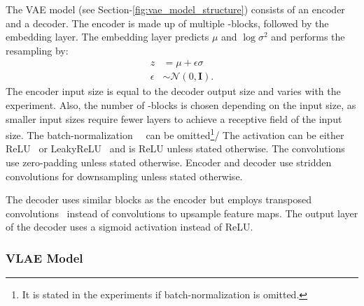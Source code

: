 The \ac{VAE} model (see Section-\ref{fig:vae_model_structure}) consists of an encoder and a decoder.
The encoder is made up of multiple -blocks, followed by the embedding layer.
The embedding layer predicts $\mu$ and $\log \sigma^2$ and performs the resampling by:
\begin{align}
    z &= \mu + \epsilon\sigma \\
    \epsilon &\sim \mathcal{N}(0, \bm{I}).
\end{align}
The encoder input size is equal to the decoder output size and varies with the experiment.
Also, the number of -blocks is chosen depending on the input size, as smaller input sizes require fewer layers to achieve a receptive field of the input size.
The batch-normalization~~\citep[pp. 317, ff.]{Goodfellow-et-al-2016} can be omitted\footnote{It is stated in the experiments if batch-normalization is omitted.}/
The activation can be either ReLU~\citep[p. 173]{Goodfellow-et-al-2016} or LeakyReLU~\citep[p. 192]{Goodfellow-et-al-2016} and is ReLU unless stated otherwise.
The convolutions use zero-padding unless stated otherwise.
Encoder and decoder use stridden convolutions for downsampling unless stated otherwise.

The decoder uses similar blocks as the encoder but employs transposed convolutions~\citep[pp. 356, ff.]{Goodfellow-et-al-2016} instead of convolutions to upsample feature maps.
The output layer of the decoder uses a sigmoid activation instead of ReLU.

\subsubsection{VLAE Model}

